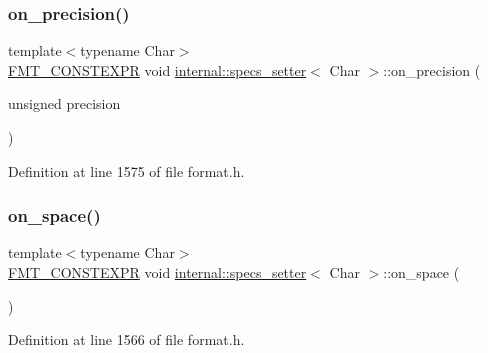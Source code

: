 \subsubsection{\texorpdfstring{on\+\_\+precision()}{on\_precision()}}
{\footnotesize\ttfamily template$<$typename Char$>$ \\
\hyperlink{core_8h_a69201cb276383873487bf68b4ef8b4cd}{F\+M\+T\+\_\+\+C\+O\+N\+S\+T\+E\+X\+PR} void \hyperlink{classinternal_1_1specs__setter}{internal\+::specs\+\_\+setter}$<$ Char $>$\+::on\+\_\+precision (\begin{DoxyParamCaption}\item[{unsigned}]{precision }\end{DoxyParamCaption})\hspace{0.3cm}{\ttfamily [inline]}}



Definition at line 1575 of file format.\+h.

\mbox{\label{classinternal_1_1specs__setter_a86dccb217e6fff587efff19c7717de04}} 
\subsubsection{\texorpdfstring{on\+\_\+space()}{on\_space()}}
{\footnotesize\ttfamily template$<$typename Char$>$ \\
\hyperlink{core_8h_a69201cb276383873487bf68b4ef8b4cd}{F\+M\+T\+\_\+\+C\+O\+N\+S\+T\+E\+X\+PR} void \hyperlink{classinternal_1_1specs__setter}{internal\+::specs\+\_\+setter}$<$ Char $>$\+::on\+\_\+space (\begin{DoxyParamCaption}{ }\end{DoxyParamCaption})\hspace{0.3cm}{\ttfamily [inline]}}



Definition at line 1566 of file format.\+h.

\mbox{\label{classinternal_1_1specs__setter_a65d55d770b5953558ce0b582e95cdcf7}} 
